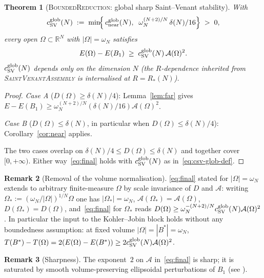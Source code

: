 \documentclass[11pt]{article}
\newtheorem{theorem}{Theorem}[section]
\theoremstyle{definition}
\newtheorem{remark}[theorem]{Remark}
\newcommand{\R}{\mathbb{R}}
\newcommand{\Fr}{\mathcal{A}}
\newcommand{\Om}{\Omega}
\begin{document}
\begin{theorem}[\textsc{BoundedReduction}: global sharp Saint--Venant
stability]\label{thm:main}
With
\begin{equation}\label{eq:csv-glob-def}
   c_{\rm SV}^{\rm glob}(N)
   \;:=\;\min\!\Bigl\{\,
       c_{\rm near}^{\rm glob}(N),\;\;
       \omega_{N}^{(N+2)/N}\,\delta(N)/16
   \Bigr\}\;>\;0,
\end{equation}
every open $\Om\subset\R^{N}$ with $|\Om|=\omega_{N}$ satisfies
\begin{equation}\label{eq:final}
   E(\Om)-E(B_{1})\;\ge\;c_{\rm SV}^{\rm glob}(N)\,\Fr(\Om)^{2}.
\end{equation}
$c_{\rm SV}^{\rm glob}(N)$ depends only on the dimension $N$ (the
$R$-dependence inherited from \textsc{SaintVenantAssembly} is
internalised at $R=R_{*}(N)$).
\end{theorem}

\begin{proof}
\emph{Case A} ($D(\Om)\ge\delta(N)/4$): Lemma~\ref{lem:far} gives
$E-E(B_{1})\ge\omega_{N}^{(N+2)/N}(\delta(N)/16)\Fr(\Om)^{2}$.

\emph{Case B} ($D(\Om)\le\delta(N)$, in particular when
$D(\Om)\le\delta(N)/4$): Corollary~\ref{cor:near} applies.

The two cases overlap on $\delta(N)/4\le D(\Om)\le\delta(N)$ and
together cover $[0,+\infty)$. Either way~\eqref{eq:final} holds with
$c_{\rm SV}^{\rm glob}(N)$ as in~\eqref{eq:csv-glob-def}.
\end{proof}

\begin{remark}[Removal of the volume normalisation]\label{rem:scaling}
\eqref{eq:final} stated for $|\Om|=\omega_{N}$ extends to arbitrary
finite-measure $\Om$ by scale invariance of $D$ and $\Fr$: writing
$\Om_{*}:=(\omega_{N}/|\Om|)^{1/N}\Om$ one has $|\Om_{*}|=\omega_{N}$,
$\Fr(\Om_{*})=\Fr(\Om)$, $D(\Om_{*})=D(\Om)$, and~\eqref{eq:final} for
$\Om_{*}$ reads
$D(\Om)\ge\omega_{N}^{-(N+2)/N}c_{\rm SV}^{\rm glob}(N)\Fr(\Om)^{2}$.
In particular the input to the Kohler--Jobin block holds without any
boundedness assumption: at fixed volume $|\Om|=|B^{*}|=\omega_{N}$,
$T(B^{*})-T(\Om)=2(E(\Om)-E(B^{*}))
\ge2c_{\rm SV}^{\rm glob}(N)\Fr(\Om)^{2}$.
\end{remark}

\begin{remark}[Sharpness]
The exponent~$2$ on $\Fr$ in~\eqref{eq:final} is sharp; it is saturated
by smooth volume-preserving ellipsoidal perturbations of $B_{1}$ (see
\cite[\S1.2]{BDV}).
\end{remark}
\end{document}
